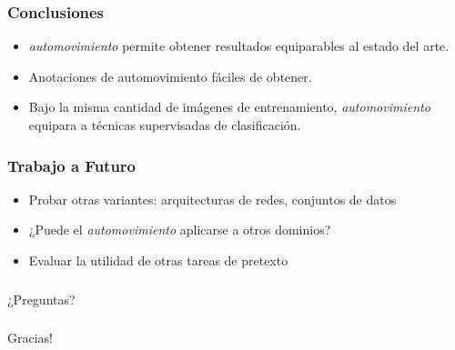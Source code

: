 \documentclass{beamer}
\begin{document}
\begin{frame}
\frametitle{Conclusiones}
\begin{itemize}
    \item \textit{automovimiento} permite obtener  resultados equiparables al estado del arte.
    \item Anotaciones de automovimiento fáciles de obtener. 
    \item Bajo la misma cantidad de imágenes de entrenamiento, \textit{automovimiento} equipara a técnicas supervisadas de clasificación.
\end{itemize}
\end{frame}





\begin{frame}
\frametitle{Trabajo a Futuro}
\begin{itemize}
    \item Probar otras variantes: arquitecturas de redes, conjuntos de datos
    \item ¿Puede el \textit{automovimiento} aplicarse a otros dominios?
    \item Evaluar la utilidad de otras tareas de pretexto
\end{itemize}
\end{frame}





\begin{frame}
\frametitle{}
\vfill
\centering
	¿Preguntas?
\vfill
\end{frame}





\begin{frame}
\frametitle{}
\vfill
\centering
    Gracias!
\vfill
\end{frame}
\end{document}
